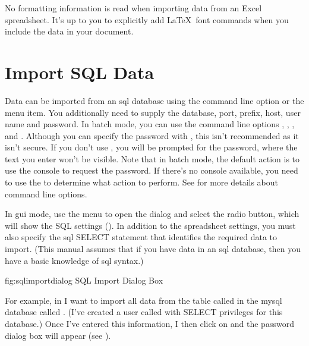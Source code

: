    \begin{information}
   No formatting information is read when importing
   data from an Excel spreadsheet. It's up to you to explicitly
   add \LaTeX\ font commands when you include the data in your
   document.
   \end{information}


\section{Import SQL Data}\label{sec:importsql}

   Data can be imported from an \gls{sql} database using
   the  command line option or the 
    menu item. You additionally need to
   supply the database, port, prefix, host, user name and password. In batch 
   mode, you can use the command line options ,
   , ,  and
   . Although you can specify the password with 
   , this isn't recommended as it isn't secure. 
   If you don't use , 
   you will be prompted for the password, where the text you enter 
   won't be visible. Note that in batch mode, the default action
   is to use the console to request the password. If there's no
console available, you need to use the 
   to determine what action to perform. See  for more details
   about command line options.

   In \gls{gui} mode, use the  menu to open the 
    dialog and select the
    radio
   button, which will show the SQL settings
   (). In addition to the spreadsheet settings,
   you must also specify the \gls{sql} SELECT statement that identifies 
   the required data to import. (This manual assumes that if you have
   data in an \gls{sql} database, then you have a basic
   knowledge of \gls{sql} syntax.)

\FloatFig
 {fig:sqlimportdialog}
 {%
 }
 {SQL Import Dialog Box}


   For example, in  I want to import all
   data from the table called  in the \gls{mysql}
   database called . (I've created a user called
    with SELECT privileges for this database.) Once I've 
   entered this information,
   I then click on  and the password
   dialog box will appear (see ).

